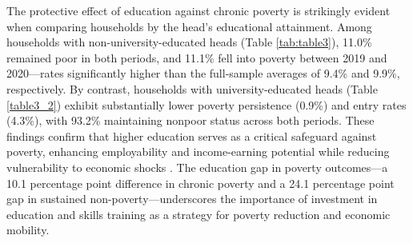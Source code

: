 \documentclass[12pt,a4paper]{article}
\begin{document}
\begin{table}[H]
     \caption*{ \footnotesize \textbf{Note:}  This table illustrates that between 2019 and  2020.  1. Poverty rates in percent are calculated using HIES data, statistical Center of Iran, and predictions obtained using data in the second survey rounds.
Full regression results are provided in Tables 2.1a and 2.1b in Appendix ??. \\
2. All calculations are weighted using population weights for each survey round. Standard errors in parentheses.\\
3. Number of replications for the estimates is 500.\\
4. Specification 1 uses $\rho_H=1$ and $\rho_S=0$ for the lower and upper bounds, respectively, and is the parametric analogue of the nonparametric bounds. Specification 2
uses $\rho_H=0.8$ and $\rho_S=0.2$, and Specification 3 uses $\rho_H=0.7$ and $\rho_S=0.3$ for the lower and upper bounds, respectively. The regressors in all regressions are the
same as in Model 1 in Table 1 plus an urban/rural dummy variable.
5. Household heads' ages are restricted to between 25 and 55 in the first survey round.}
\end{table}
The protective effect of education against chronic poverty is strikingly  evident when comparing households by the head's educational attainment. Among households with non-university-educated heads (Table \autoref{tab:table3}), 11.0\% remained poor in both periods, and 11.1\% fell into poverty between 2019 and 2020—rates significantly higher than the full-sample averages of 9.4\% and 9.9\%, respectively. By contrast, households with university-educated heads (Table \ref{table3_2}) exhibit substantially lower poverty persistence (0.9\%) and entry rates (4.3\%), with 93.2\% maintaining nonpoor status across both periods. These findings confirm that higher education serves as a critical safeguard against poverty, enhancing employability and income-earning potential while reducing vulnerability to economic shocks \citep{bilenkisi2015impact}. The education gap in poverty outcomes—a 10.1 percentage point difference in chronic poverty and a 24.1 percentage point gap in sustained non-poverty—underscores the importance of investment in education and skills training as a strategy for poverty reduction and economic mobility.
\end{document}
